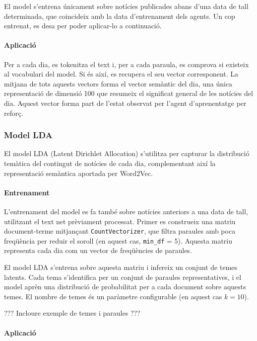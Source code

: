 \documentclass[12pt,a4paper,twoside]{book}
\begin{document}
El model s'entrena únicament sobre notícies publicades abans d'una data de tall determinada, que coincideix amb la data d'entrenament dels agents. Un cop entrenat, es desa per poder aplicar-lo a continuació.

\paragraph{Aplicació}

Per a cada dia, es tokenitza el text i, per a cada paraula, es comprova si existeix al vocabulari del model. Si és així, es recupera el seu vector corresponent. La mitjana de tots aquests vectors forma el vector semàntic del dia, una única representació de dimensió 100 que resumeix el significat general de les notícies del dia. Aquest vector forma part de l'estat observat per l'agent d'aprenentatge per reforç.

\vspace{1em}

\subsubsection{Model LDA}

El model LDA (Latent Dirichlet Allocation) s'utilitza per capturar la distribució temàtica del contingut de notícies de cada dia, complementant així la representació semàntica aportada per Word2Vec.

\paragraph{Entrenament}

L'entrenament del model es fa també sobre notícies anteriors a una data de tall, utilitzant el text net prèviament processat. Primer es construeix una matriu document-terme mitjançant \texttt{CountVectorizer}, que filtra paraules amb poca freqüència per reduir el soroll (en aquest cas, \texttt{min\_df} = 5). Aquesta matriu representa cada dia com un vector de freqüències de paraules.

El model LDA s'entrena sobre aquesta matriu i infereix un conjunt de temes latents. Cada tema s'identifica per un conjunt de paraules representatives, i el model aprèn una distribució de probabilitat per a cada document sobre aquests temes. El nombre de temes és un paràmetre configurable (en aquest cas $k = 10$).

??? Incloure exemple de temes i paraules ???

\paragraph{Aplicació}
\end{document}
